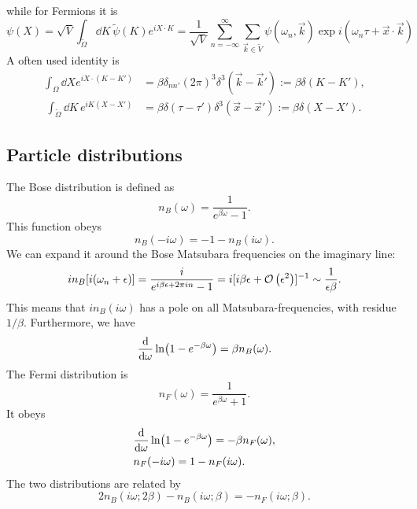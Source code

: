 while for Fermions it is
\begin{equation}
    \psi(X) 
    = \sqrt{V} \int_{\tilde \Omega} \dd K \, \tilde \psi(K) e^{i X\cdot K} 
    = \frac{1}{\sqrt{V}} \sum_{n = - \infty}^\infty \sum_{\vec k \in \tilde V}
    \psi(\omega_n, \vec k) \exp{i(\omega_n \tau + \vec x \cdot \vec k)}
\end{equation}
A often used identity is 
\begin{align}
    \label{thermal delta}
    \int_{\Omega} \dd X e^{i X\cdot(K - K')} 
    & = \beta \delta_{nn'} (2 \pi)^3 \delta^3(\vec k - \vec k') := \beta \delta(K - K'), \\\
    \int_{\tilde \Omega} \dd K \, e^{i K(X - X')} 
    & = \beta \delta (\tau - \tau') \delta^3(\vec x - \vec x') 
    := \beta \delta(X - X').
\end{align}

\subsection*{Particle distributions}
The Bose distribution is defined as 
\begin{equation}
    n_B(\omega) = \frac{1}{e^{\beta \omega} - 1}.
\end{equation}
This function obeys
\begin{equation}
    n_B(- i \omega) = -1 - n_B(i \omega).
\end{equation}
We can expand it around the Bose Matsubara frequencies on the imaginary line:
\begin{equation}
    i n_B[i (\omega_n + \epsilon)] = \frac{i}{e^{i\beta \epsilon + 2 \pi i n} - 1}
    = i [i\beta \epsilon + \mathcal{O}\left(\epsilon^{2}\right) ]^{-1} \sim  \frac{1}{\epsilon \beta}.
\end{equation}
This means that $in_B(i\omega)$ has a pole on all Matsubara-frequencies, with residue $1/\beta$.
Furthermore, we have
\begin{equation}
    \dv{\omega} \ln(1 - e^{-\beta \omega}) = \beta n_B(\omega).
\end{equation}
The Fermi distribution is
\begin{equation}
    n_F(\omega) = \frac{1}{e^{\beta \omega} + 1}.
\end{equation}
It obeys
\begin{align}
    &\diff{}{\omega} \ln(1 - e^{-\beta \omega}) = - \beta n_F(\omega), \\
    & n_F(- i\omega) = 1 - n_F(i\omega).
\end{align}
The two distributions are related by
\begin{equation}
    2 n_B(i \omega; 2\beta) - n_B(i \omega; \beta)
    = - n_F(i \omega; \beta ).
\end{equation}

